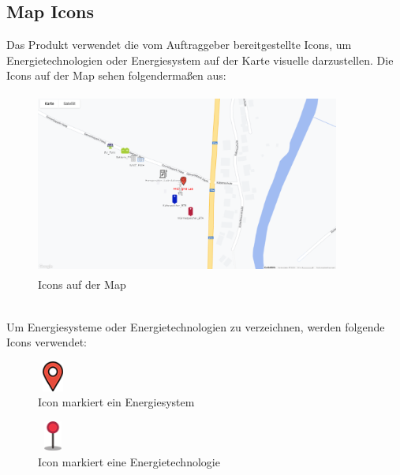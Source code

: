 \subsection{Map Icons}
Das Produkt verwendet die vom Auftraggeber bereitgestellte Icons, um Energietechnologien oder Energiesystem auf der Karte visuelle darzustellen. Die Icons auf der Map sehen folgendermaßen aus:
\begin{figure}[h]
	\centering
	\includegraphics[height=6cm,width=10cm]{images/MapIcons}
	\caption{Icons auf der Map}
	\label{fig: Icons auf der Map}
\end{figure}
\\
Um Energiesysteme oder Energietechnologien zu verzeichnen, werden folgende Icons verwendet: 
\begin{figure}[h]
	\centering
	\includegraphics[height=1cm,width=1cm]{images/Icons/esrot}
	\caption{Icon markiert ein Energiesystem}
	\label{fig: EnergiesystemIcon}
\end{figure}
\begin{figure}[h]
	\centering
	\includegraphics[height=1cm,width=1cm]{images/Icons/etrot}
	\caption{Icon markiert eine Energietechnologie}
	\label{fig: EnergietechnologieIcon}
\end{figure}



